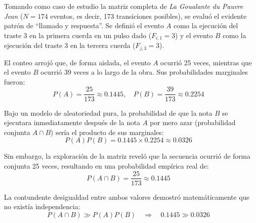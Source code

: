 \documentclass{article}
\theoremstyle{plain}
\theoremstyle{definition}
\begin{document}
Tomando como caso de estudio la matriz completa de \textit{La Goualante du Pauvre Jean} ($N=174$ eventos, es decir, 173 transiciones posibles), se evaluó el evidente patrón de ``llamado y respuesta''. Se definió el evento $A$ como la ejecución del traste 3 en la primera cuerda en un pulso dado ($F_{i,1} = 3$) y el evento $B$ como la ejecución del traste 3 en la tercera cuerda ($F_{j,3} = 3$). 

El conteo arrojó que, de forma aislada, el evento $A$ ocurrió 25 veces, mientras que el evento $B$ ocurrió 39 veces a lo largo de la obra. Sus probabilidades marginales fueron:
\[
    P(A) = \frac{25}{173} \approx 0.1445, \quad P(B) = \frac{39}{173} \approx 0.2254
\]

Bajo un modelo de aleatoriedad pura, la probabilidad de que la nota $B$ se ejecutara inmediatamente después de la nota $A$ por mero azar (probabilidad conjunta $A \cap B$) sería el producto de sus marginales:
\[
    P(A)P(B) = 0.1445 \times 0.2254 \approx 0.0326
\]

Sin embargo, la exploración de la matriz reveló que la secuencia ocurrió de forma conjunta 25 veces, resultando en una probabilidad empírica real de:
\[
    P(A \cap B) = \frac{25}{173} \approx 0.1445
\]

La contundente desigualdad entre ambos valores demostró matemáticamente que no existía independencia:
\[
    P(A \cap B) \gg P(A)P(B) \quad \Longrightarrow \quad 0.1445 \gg 0.0326
\]
\end{document}
